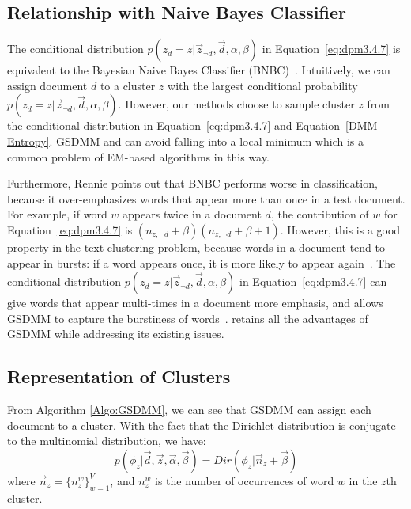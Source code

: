 \subsection{Relationship with Naive Bayes Classifier} \label{sec:NBC}

The conditional distribution $p(z_d=z|\vec{z}_{\neg{d}}, \vec{d}, \alpha, \beta)$ in Equation~\eqref{eq:dpm3.4.7} is equivalent to the Bayesian Naive Bayes Classifier (BNBC)~\cite{rennie01BayesianNBC}. Intuitively, we can assign document $d$ to a cluster $z$ with the largest conditional probability $p(z_d=z|\vec{z}_{\neg{d}}, \vec{d}, \alpha, \beta)$. However, our methods choose to sample cluster $z$ from the conditional distribution in Equation~\eqref{eq:dpm3.4.7} and Equation~\eqref{DMM-Entropy}. GSDMM and \sysname{} can avoid falling into a local minimum which is a common problem of EM-based algorithms in this way.

Furthermore, Rennie \cite{rennie01BayesianNBC} points out that BNBC performs worse in classification, because it over-emphasizes words that appear more than once in a test document. For example, if word $w$ appears twice in a document $d$, the contribution of $w$ for Equation~\eqref{eq:dpm3.4.7} is $(n_{z,\neg{d}} + \beta)(n_{z,\neg{d}} + \beta + 1)$. However, this is a good property in the text clustering problem, because words in a document tend to appear in bursts: if a word appears once, it is more likely to appear again~\cite{DCMmadsen2005modeling,rennie2003Burstness}. The conditional distribution $p(z_d=z|\vec{z}_{\neg{d}}, \vec{d}, \alpha, \beta)$ in Equation~\eqref{eq:dpm3.4.7} can give words that appear multi-times in a document more emphasis, and allows GSDMM to capture the burstiness of words~\cite{DCMelkan2006clustering}. \sysname{} retains all the advantages of GSDMM while addressing its existing issues.

\subsection{Representation of Clusters}
From Algorithm \ref{Algo:GSDMM}, we can see that GSDMM can assign each document to a cluster. With the fact that the Dirichlet distribution is conjugate to the multinomial distribution, we have:
\begin{equation}\label{eq:posterior}
    p(\phi_{z} | \vec{d}, \vec{z}, \vec{\alpha}, \vec{\beta})
    =Dir(\phi_{z} | \vec{n}_z + \vec{\beta})
\end{equation}
where $\vec{n}_z = \{n_z^{w}\}_{w=1}^V$, and $n_z^{w}$ is the number of occurrences of word $w$ in the $z$th cluster.

